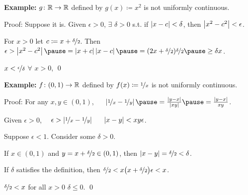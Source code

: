 \documentclass[10pt,aspectratio=149]{beamer}
\begin{document}
\begin{frame}

\textbf{Example:}
$g \colon {\mathbb{R}} \to {\mathbb{R}}$ defined by $g(x) \coloneqq x^2$ is not uniformly
continuous.

\pause
\medskip

Proof: Suppose it is.
\pause
Given $\epsilon > 0$,
$\exists$ $\delta > 0$ s.t.
if $\left\lvert {x-c} \right\rvert < \delta$, then $\left\lvert {x^2 -c^2} \right\rvert < \epsilon$.

\pause
For $x > 0$ let $c \coloneqq x+\nicefrac{\delta}{2}$.
\pause
Then
$\epsilon >
\abs{x^2-c^2}
\pause
= \abs{x+c}\abs{x-c}
\pause
=
(2x+\nicefrac{\delta}{2})\nicefrac{\delta}{2} 
\pause
\geq 
\delta x$.

\pause
\thus \quad $x < \nicefrac{\epsilon}{\delta}$ $\forall$ $x > 0$,
\pause
\quad
\contradiction
\qed

\pause
\medskip

\textbf{Example:}
$f \colon (0,1) \to {\mathbb{R}}$ defined by $f(x) \coloneqq \nicefrac{1}{x}$ is not
uniformly continuous.

\pause
\medskip

Proof:
For any $x,y \in (0,1)$, ~~
$\abs{\nicefrac{1}{x}-\nicefrac{1}{y}}
\pause
=
\frac{\abs{y-x}}{\abs{xy}} 
\pause
=
\frac{\abs{y-x}}{xy}$.

\pause
\medskip

Given $\epsilon > 0$,~~
$\epsilon >
\left\lvert {\nicefrac{1}{x}-\nicefrac{1}{y}} \right\rvert$ ~\iffif~
$\left\lvert {x-y} \right\rvert < xy \epsilon$.

\pause
Suppose $\epsilon < 1$.  Consider some $\delta > 0$.

\pause
If $x \in (0,1)$ and 
$y = x+\nicefrac{\delta}{2} \in (0,1)$,
then $\left\lvert {x-y} \right\rvert = \nicefrac{\delta}{2} < \delta$.

\pause
If $\delta$ satisfies the definition, then $\nicefrac{\delta}{2} < x \bigl( x+\nicefrac{\delta}{2} \bigr) \epsilon < x$.

\pause
\medskip

$\nicefrac{\delta}{2} < x$ for all $x > 0$
\wthus
$\delta \leq 0$.
\pause
\quad
\contradiction
\qed
\end{frame}
\end{document}
